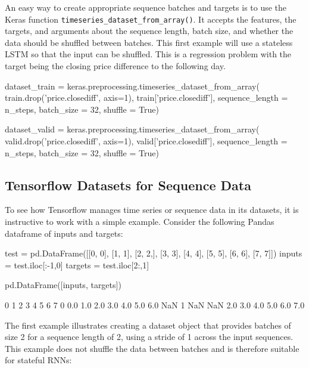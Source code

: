 \begin{withcode}
An easy way to create appropriate sequence batches and targets is to use the Keras function \texttt{timeseries\_dataset\_from\_array()}. It accepts the features, the targets, and arguments about the sequence length, batch size, and whether the data should be shuffled between batches. This first example will use a stateless LSTM so that the input can be shuffled. This is a regression problem with the target being the closing price difference to the following day.

\begin{pythoncode}
dataset_train = keras.preprocessing.timeseries_dataset_from_array(
    train.drop('price.closediff', axis=1), 
    train['price.closediff'],
    sequence_length = n_steps,
    batch_size = 32,
    shuffle = True)
\end{pythoncode}

\begin{pythoncode}
dataset_valid = keras.preprocessing.timeseries_dataset_from_array(
    valid.drop('price.closediff', axis=1), 
    valid['price.closediff'],
    sequence_length = n_steps,
    batch_size = 32,
    shuffle = True)
\end{pythoncode}

\subsection*{Tensorflow Datasets for Sequence Data}

To see how Tensorflow manages time series or sequence data in its datasets, it is instructive to work with a simple example. Consider the following Pandas dataframe of inputs and targets:

\begin{pythoncode}
test = pd.DataFrame([[0, 0], [1, 1], [2, 2,], [3, 3], 
                     [4, 4], [5, 5], [6, 6], [7, 7]]) 
inputs = test.iloc[:-1,0]
targets = test.iloc[2:,1]

pd.DataFrame([inputs, targets])
\end{pythoncode}

\begin{textcode}
     0    1    2    3    4    5    6    7
0  0.0  1.0  2.0  3.0  4.0  5.0  6.0  NaN
1  NaN  NaN  2.0  3.0  4.0  5.0  6.0  7.0
\end{textcode}

The first example illustrates creating a dataset object that provides batches of size 2 for a sequence length of 2, using a stride of 1 across the input sequences. This example does not shuffle the data between batches and is therefore suitable for stateful RNNs:


\end{withcode}
